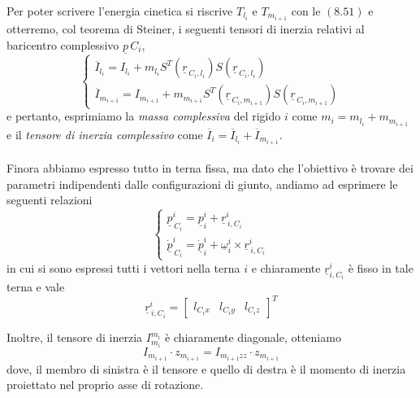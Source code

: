Per poter scrivere l'energia cinetica si riscrive $T_{l_i}$ e $T_{m_{i+1}}$ con le $(8.51)$ e otterremo, col teorema di Steiner, i seguenti tensori di inerzia relativi al baricentro complessivo $\underline{p}{\,C_i}$,
\begin{equation}
	\begin{cases}
		\overline{I}_{l_i} = I_{l_i} + m_{l_i} S^T(\underline{r}_{\,C_i, l_i})S(\underline{r}_{\,C_i, l_i}) \\
		\overline{I}_{m_{i+1}} = I_{m_{i+1}} + m_{m_{i+1}} S^T(\underline{r}_{\,C_i, m_{i+1}})S(\underline{r}_{\,C_i, m_{i+1}})
	\end{cases}
\end{equation}
e pertanto, esprimiamo la \emph{massa complessiva} del rigido $i$ come $m_i = m_{l_i} + m_{m_{i+1}}$ e il \emph{tensore di inerzia complessivo} come $\overline{I}_i = \overline{I}_{l_i} + \overline{I}_{m_{i+1}}$. 

\paragraph{}
Finora abbiamo espresso tutto in terna fissa, ma dato che l'obiettivo è trovare dei parametri indipendenti dalle configurazioni di giunto, andiamo ad esprimere le seguenti relazioni
\begin{equation}
	\begin{cases}
		\underline{p}_{\,C_i}^i = \underline{p}_i^i + \underline{r}_{\,i,C_i}^i \\
		\underline{\dot{p}}_{\,C_i}^i = \underline{\dot{p}}_i^i + \underline{\omega}_i^i \times \underline{r}_{\,i,C_i}^i
	\end{cases}
\end{equation}
in cui si sono espressi tutti i vettori nella terna $i$ e chiaramente $\underline{r}_{i,C_i}^i$ è fisso in tale terna e vale
\begin{equation}
	\underline{r}_{\,i,C_i}^i = 
	\begin{bmatrix}
		l_{C_ix} & l_{C_iy} & l_{C_iz}
	\end{bmatrix}^T
\end{equation}

Inoltre, il tensore di inerzia $I_{m_i}^{m_i}$ è chiaramente diagonale, otteniamo
\begin{equation}
	I_{m_{i+1}} \cdot z_{m_{i+1}} = I_{m_{i+1}zz} \cdot z_{m_{i+1}}
\end{equation}
dove, il membro di sinistra è il tensore e quello di destra è il momento di inerzia proiettato nel proprio asse di rotazione.

